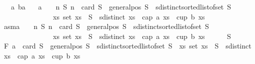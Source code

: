 \begin{isabellebody}
\ \ \ {\isachardoublequoteopen}a{\isasymge}{}{\isachardoublequoteclose}\ {\isachardoublequoteopen}b{\isasymge}a{\isachardoublequoteclose}\isanewline
\ \ \ {\isachardoublequoteopen}a\ {\isacharminus}{\kern0pt}\ {}\ {\isasymnotin}\ {\isacharbraceleft}{\kern0pt}n{\isachardot}{\kern0pt}\ {\isasymforall}S{\isachardot}{\kern0pt}\ n\ {\isacharequal}{\kern0pt}\ card\ S\ {\isasymand}\ general{\isacharunderscore}{\kern0pt}pos\ S\ {\isasymand}\ sdistinct{\isacharparenleft}{\kern0pt}sorted{\isacharunderscore}{\kern0pt}list{\isacharunderscore}{\kern0pt}of{\isacharunderscore}{\kern0pt}set\ S{\isacharparenright}{\kern0pt}\ {\isasymlongrightarrow}\ \isanewline
\ \ \ \ \ \ \ \ \ \ \ \ \ \ \ {\isacharparenleft}{\kern0pt}{\isasymexists}xs{\isachardot}{\kern0pt}\ set\ xs\ {\isasymsubseteq}\ S\ {\isasymand}\ sdistinct\ xs\ {\isasymand}\ {\isacharparenleft}{\kern0pt}cap\ a\ xs\ {\isasymor}\ cup\ b\ xs{\isacharparenright}{\kern0pt}{\isacharparenright}{\kern0pt}{\isacharbraceright}{\kern0pt}{\isachardoublequoteclose}\isanewline
%
\isadelimproof
%
\endisadelimproof
%
\isatagproof
{}\isamarkupfalse%
{\isacharminus}{\kern0pt}\isanewline
\ \ \isakeywordONE{{\isacharbraceleft}{\kern0pt}}\isamarkupfalse%
\isanewline
\ \ \ \ \isamarkupfalse%
\ asm{\isacharcolon}{\kern0pt}{\isachardoublequoteopen}a\ {\isacharminus}{\kern0pt}\ {}\ {\isasymin}\ {\isacharbraceleft}{\kern0pt}n{\isachardot}{\kern0pt}\ {\isasymforall}S{\isachardot}{\kern0pt}\ n\ {\isacharequal}{\kern0pt}\ card\ S\ {\isasymand}\ general{\isacharunderscore}{\kern0pt}pos\ S\ {\isasymand}\ sdistinct{\isacharparenleft}{\kern0pt}sorted{\isacharunderscore}{\kern0pt}list{\isacharunderscore}{\kern0pt}of{\isacharunderscore}{\kern0pt}set\ S{\isacharparenright}{\kern0pt}\ {\isasymlongrightarrow}\isanewline
\ \ \ \ \ \ \ \ \ \ \ \ \ \ \ {\isacharparenleft}{\kern0pt}{\isasymexists}xs{\isachardot}{\kern0pt}\ set\ xs\ {\isasymsubseteq}\ S\ {\isasymand}\ sdistinct\ xs\ {\isasymand}\ {\isacharparenleft}{\kern0pt}cap\ a\ xs\ {\isasymor}\ cup\ b\ xs{\isacharparenright}{\kern0pt}{\isacharparenright}{\kern0pt}{\isacharbraceright}{\kern0pt}{\isachardoublequoteclose}\isanewline
\ \ \ \ \isamarkupfalse%
\ S\isanewline
\ \ \ \ \isamarkupfalse%
\ F{}{\isacharcolon}{\kern0pt}\ {\isachardoublequoteopen}a{\isacharminus}{\kern0pt}{}\ {\isacharequal}{\kern0pt}\ card\ S\ {\isasymand}\ general{\isacharunderscore}{\kern0pt}pos\ S\ {\isasymand}\ sdistinct{\isacharparenleft}{\kern0pt}sorted{\isacharunderscore}{\kern0pt}list{\isacharunderscore}{\kern0pt}of{\isacharunderscore}{\kern0pt}set\ S{\isacharparenright}{\kern0pt}\ {\isasymlongrightarrow}\ {\isacharparenleft}{\kern0pt}{\isasymexists}xs{\isachardot}{\kern0pt}\ set\ xs\ {\isasymsubseteq}\ S\ {\isasymand}\ sdistinct\ xs\ {\isasymand}\ {\isacharparenleft}{\kern0pt}cap\ a\ xs\ {\isasymor}\ cup\ b\ xs{\isacharparenright}{\kern0pt}{\isacharparenright}{\kern0pt}{\isachardoublequoteclose}\ \isanewline

\end{isabellebody}
